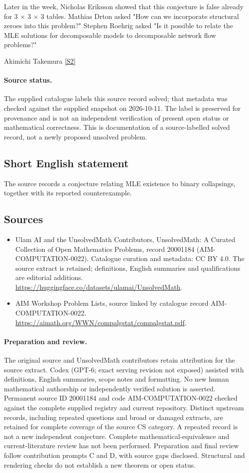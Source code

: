 \documentclass[11pt]{article}
\newcommand{\sref}[2]{\hyperlink{source:#1:#2}{[S#2]}}
\begin{document}
Later in the week, Nicholas Eriksson showed that this conjecture is false already for 3 × 3 × 3 tables. Mathias Drton asked "How can we incorporate structural zeroes into this problem?" Stephen Roehrig asked "Is it possible to relate the MLE solutions for decomposable models to decomposable network flow problems?"

Akimichi Takemura \sref{20001184}{2}
\paragraph{Source status.}
The supplied catalogue labels this source record solved; that metadata was checked against the supplied snapshot on 2026-10-11. The label is preserved for provenance and is not an independent verification of present open status or mathematical correctness. This is documentation of a source-labelled solved record, not a newly proposed unsolved problem.
\subsection{Short English statement}
The source records a conjecture relating MLE existence to binary collapsings, together with its reported counterexample.
\subsection{Sources}
\begin{itemize}
\item[\hypertarget{source:20001184:1}{S1}] Ulam AI and the UnsolvedMath Contributors, UnsolvedMath: A Curated Collection of Open Mathematics Problems, record 20001184 (AIM-COMPUTATION-0022). Catalogue curation and metadata: CC BY 4.0. The source extract is retained; definitions, English summaries and qualifications are editorial additions.
\url{https://huggingface.co/datasets/ulamai/UnsolvedMath}.
\item[\hypertarget{source:20001184:2}{S2}] AIM Workshop Problem Lists, source linked by catalogue record AIM-COMPUTATION-0022.
\url{https://aimath.org/WWN/compalgstat/compalgstat.pdf}.
\end{itemize}
\paragraph{Preparation and review.}
The original source and UnsolvedMath contributors retain attribution for the source extract. Codex (GPT-6; exact serving revision not exposed) assisted with definitions, English summaries, scope notes and formatting. No new human mathematical authorship or independently verified solution is asserted. Permanent source ID 20001184 and code AIM-COMPUTATION-0022 checked against the complete supplied registry and current repository. Distinct upstream records, including repeated questions and broad or damaged extracts, are retained for complete coverage of the source CS category. A repeated record is not a new independent conjecture. Complete mathematical-equivalence and current-literature review has not been performed. Preparation and final review follow contribution prompts C and D, with source gaps disclosed. Structural and rendering checks do not establish a new theorem or open status.
\label{end:20001184}
\end{document}
